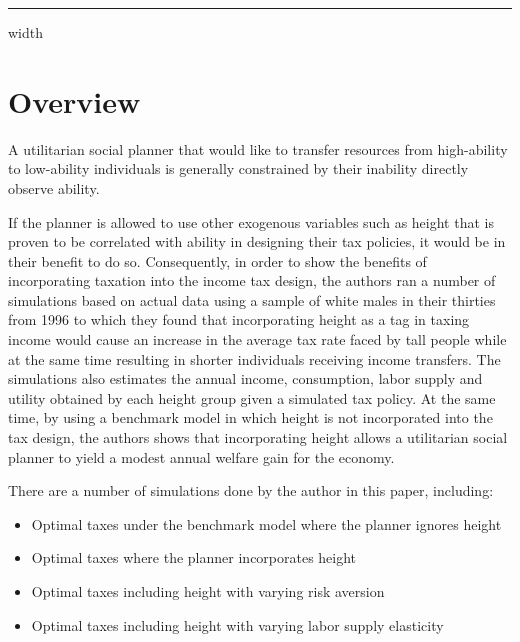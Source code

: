 \documentclass[titlepage]{\econtex}
\begin{document}
\titlepagefinish



\hrule height 0.4pt depth 0.0pt width \textwidth \relax

\medskip \medskip

\hypertarget{Overview}{}
\section{Overview}

A utilitarian social planner that would like to transfer resources from high-ability to low-ability individuals is generally constrained by their inability directly observe ability.

If the planner is allowed to use other exogenous variables such as  height that is proven to be correlated with ability in designing their tax policies, it would be in their benefit to do so.
Consequently, in order to show the benefits of incorporating taxation into the income tax design, the authors ran a number of simulations based on actual data using a sample of white males in their thirties from 1996 to which they found that incorporating  height as a tag in taxing income would cause an increase in the average tax rate faced by tall people while at the same time resulting in shorter individuals receiving income transfers. The simulations also estimates the annual income, consumption, labor supply and utility obtained by each height group given a simulated tax policy.  At the same time, by using a benchmark model in which height is not incorporated into the tax design, the authors shows that incorporating height allows a  utilitarian social planner to  yield a modest annual welfare gain for the economy.

There are a number of simulations done by the author in this paper, including:
\begin{itemize}
  \item Optimal taxes under the benchmark model where the planner ignores height 
  \item Optimal taxes where the planner incorporates height
  \item Optimal taxes including height with varying risk aversion
  \item Optimal taxes including height with varying labor supply elasticity
\end{itemize}
\end{document}
